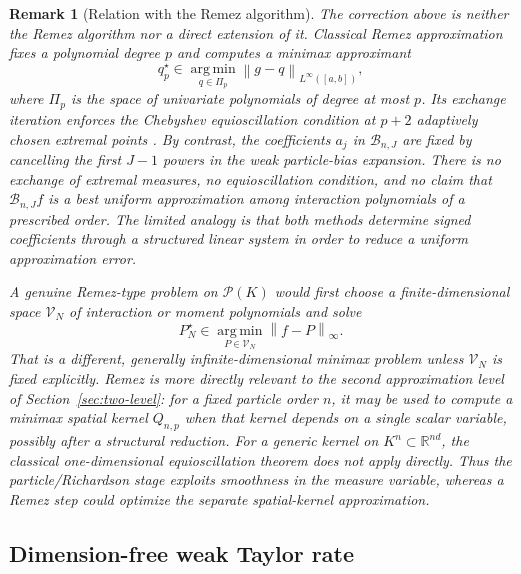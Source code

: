 \documentclass[11pt]{article}
\newtheorem{remark}{Remark}
\newcommand{\Pcal}{\mathcal P}
\newcommand{\R}{\mathbb R}
\newcommand{\norm}[1]{\left\lVert #1\right\rVert}
\begin{document}
\begin{remark}[Relation with the Remez algorithm]
The correction above is neither the Remez algorithm nor a direct extension
of it. Classical Remez approximation fixes a polynomial degree \(p\) and
computes a minimax approximant
\[
q_p^\star
\in
\operatorname*{arg\,min}_{q\in\Pi_p}
\norm{g-q}_{L^\infty([a,b])},
\]
where \(\Pi_p\) is the space of univariate polynomials of degree at most
\(p\). Its exchange iteration enforces the Chebyshev equioscillation
condition at \(p+2\) adaptively chosen extremal points
\cite{remez}. By contrast, the coefficients \(a_j\) in
\(\mathcal B_{n,J}\) are fixed by cancelling the first \(J-1\) powers in
the weak particle-bias expansion. There is no exchange of extremal
measures, no equioscillation condition, and no claim that
\(\mathcal B_{n,J}f\) is a best uniform approximation among interaction
polynomials of a prescribed order. The limited analogy is that both
methods determine signed coefficients through a structured linear system
in order to reduce a uniform approximation error.

A genuine Remez-type problem on \(\Pcal(K)\) would first choose a
finite-dimensional space \(\mathcal V_N\) of interaction or moment
polynomials and solve
\[
P_N^\star
\in
\operatorname*{arg\,min}_{P\in\mathcal V_N}
\norm{f-P}_\infty.
\]
That is a different, generally infinite-dimensional minimax problem unless
\(\mathcal V_N\) is fixed explicitly. Remez is more directly relevant to
the second approximation level of Section~\ref{sec:two-level}: for a
fixed particle order \(n\), it may be used to compute a minimax spatial
kernel \(Q_{n,p}\) when that kernel depends on a single scalar variable,
possibly after a structural reduction. For a generic kernel on
\(K^n\subset\R^{nd}\), the classical one-dimensional equioscillation
theorem does not apply directly. Thus the
particle/Richardson stage exploits smoothness in the measure variable,
whereas a Remez step could optimize the separate spatial-kernel
approximation.
\end{remark}

\subsection{Dimension-free weak Taylor rate}
\end{document}
